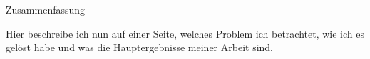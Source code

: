 \begin{center} 
\huge Zusammenfassung
\end{center}

Hier beschreibe ich nun auf einer Seite, welches Problem ich betrachtet, wie ich es gel\"ost habe
und was die Hauptergebnisse meiner Arbeit sind.

